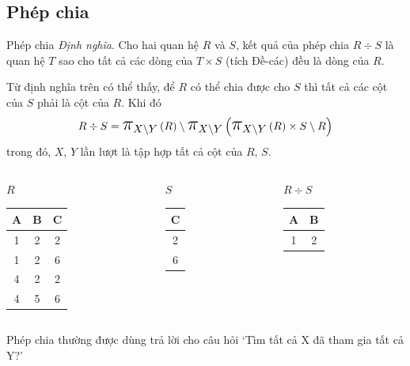 \documentclass[11pt, handout]{beamer}
\newcommand{\mmm}[1]{\mathlarger{\mathlarger{\mathlarger#1}}}%
\newcommand{\ppi}[2]{\mmm{\pi}_{#1}\left(#2\right)}%
\begin{document}
  \subsection{Phép chia}
  \begin{frame}{Phép chia}
    \textit{Định nghĩa}. Cho hai quan hệ $R$ và $S$, kết quả của phép chia $R \div S$ là 
    quan hệ $T$ sao cho tất cả các dòng của $T \times S$ (tích Đề-các) đều là dòng của $R$.
  \end{frame}
  \begin{frame}
    Từ định nghĩa trên có thể thấy, để $R$ có thể chia được cho $S$ 
    thì tất cả các cột của $S$ phải là cột của $R$. Khi đó
    $$
    R \div S = \ppi{X \setminus Y}{R} \setminus \ppi{X \setminus Y}{{\ppi{X \setminus Y}{R} \times S} \setminus R}
    $$
    trong đó, $X$, $Y$ lần lượt là tập hợp tất cả cột của $R$, $S$.
  \end{frame}
  \begin{frame}
    \begin{columns}[T]
      \begin{column}{0.3\textwidth}
        \centering $R$
        \medskip \\
        \begin{tabular}{|c|c|c|}
          \hline
          \textbf{A} & \textbf{B} & \textbf{C}\\[0.5ex] \hline\hline
          \rowcolor{blue!25}
          1 & 2 & 2\\ \hline
          \rowcolor{blue!25}
          1 & 2 & 6\\ \hline
          4 & 2 & 2\\ \hline
          4 & 5 & 6\\ \hline
        \end{tabular}
      \end{column}
      \begin{column}{0.2\textwidth}
        \centering $S$
        \medskip \\
        \begin{tabular}{|c|}
          \hline
          \textbf{C} \\[0.5ex] \hline\hline
          2\\ \hline
          6\\ \hline          
        \end{tabular}
      \end{column}
      \begin{column}{0.3\textwidth}
        \centering $R \div S$
        \medskip \\
        \begin{tabular}{|c|c|}
          \hline
          \textbf{A} & \textbf{B} \\[0.5ex] \hline\hline
          1 & 2\\ \hline
        \end{tabular}
      \end{column}
    \end{columns}
  \end{frame}
  \begin{frame}
    Phép chia thường được dùng trả lời cho câu hỏi `Tìm tất cả X đã tham gia tất cả Y?'
  \end{frame}
\end{document}
